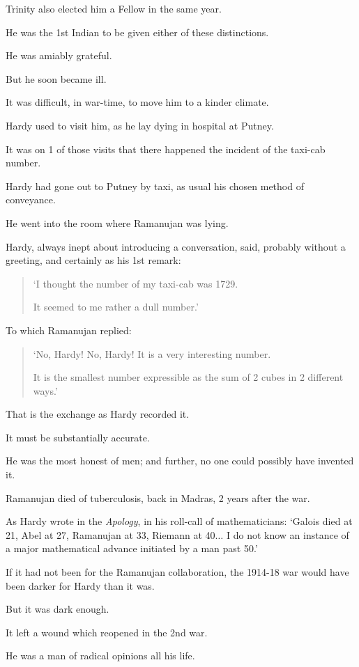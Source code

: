 \documentclass{article}
\numberwithin{equation}{section}
\begin{document}
Trinity also elected him a Fellow in the same year.

He was the 1st Indian to be given either of these distinctions.

He was amiably grateful.

But he soon became ill.

It was difficult, in war-time, to move him to a kinder climate.

%
Hardy used to visit him, as he lay dying in hospital at Putney.

It was on 1 of those visits that there happened the incident of the taxi-cab number.

Hardy had gone out to Putney by taxi, as usual his chosen method of conveyance.

He went into the room where Ramanujan was lying.

Hardy, always inept about introducing a conversation, said, probably without a greeting, and certainly as his 1st remark:
\begin{quotation}
    `I thought the number of my taxi-cab was 1729.
    
    It seemed to me rather a dull number.'
\end{quotation}
To which Ramanujan replied:
\begin{quotation}
    `No, Hardy! No, Hardy! It is a very interesting number.
    
    It is the smallest number expressible as the sum of 2 cubes in 2 different ways.'
\end{quotation}
That is the exchange as Hardy recorded it.

It must be substantially accurate.

He was the most honest of men; and further, no one could possibly have invented it.

Ramanujan died of tuberculosis, back in Madras, 2 years after the war.

As Hardy wrote in the \textit{Apology}, in his roll-call of mathematicians: `Galois died at 21, Abel at 27, Ramanujan at 33, Riemann at 40$\ldots$ I do not know an instance of a major mathematical advance initiated by a man past 50.'

%
If it had not been for the Ramanujan collaboration, the 1914-18 war would have been darker for Hardy than it was.

But it was dark enough.

It left a wound which reopened in the 2nd war.

He was a man of radical opinions all his life.
\end{document}
